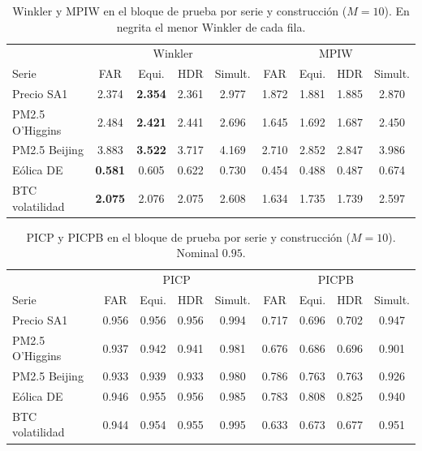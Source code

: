 \begin{table}[H]
\centering\small
\setlength{\tabcolsep}{3.5pt}
\caption{Winkler y MPIW en el bloque de prueba por serie y construcción ($M = 10$). En negrita el menor Winkler de cada fila.}
\label{tab:aneD_bloqueB_winkler}
\begin{tabular}{l cccc cccc}
\hline
 & \multicolumn{4}{c}{Winkler} & \multicolumn{4}{c}{MPIW} \\
Serie & FAR & Equi. & HDR & Simult. & FAR & Equi. & HDR & Simult. \\
\hline
Precio SA1 & 2.374 & \textbf{2.354} & 2.361 & 2.977 & 1.872 & 1.881 & 1.885 & 2.870 \\
PM2.5 O'Higgins & 2.484 & \textbf{2.421} & 2.441 & 2.696 & 1.645 & 1.692 & 1.687 & 2.450 \\
PM2.5 Beijing & 3.883 & \textbf{3.522} & 3.717 & 4.169 & 2.710 & 2.852 & 2.847 & 3.986 \\
Eólica DE & \textbf{0.581} & 0.605 & 0.622 & 0.730 & 0.454 & 0.488 & 0.487 & 0.674 \\
BTC volatilidad & \textbf{2.075} & 2.076 & 2.075 & 2.608 & 1.634 & 1.735 & 1.739 & 2.597 \\
\hline
\end{tabular}
\end{table}

\begin{table}[H]
\centering\small
\setlength{\tabcolsep}{3.5pt}
\caption{PICP y PICPB en el bloque de prueba por serie y construcción ($M = 10$). Nominal $0.95$.}
\label{tab:aneD_bloqueB_picp}
\begin{tabular}{l cccc cccc}
\hline
 & \multicolumn{4}{c}{PICP} & \multicolumn{4}{c}{PICPB} \\
Serie & FAR & Equi. & HDR & Simult. & FAR & Equi. & HDR & Simult. \\
\hline
Precio SA1 & 0.956 & 0.956 & 0.956 & 0.994 & 0.717 & 0.696 & 0.702 & 0.947 \\
PM2.5 O'Higgins & 0.937 & 0.942 & 0.941 & 0.981 & 0.676 & 0.686 & 0.696 & 0.901 \\
PM2.5 Beijing & 0.933 & 0.939 & 0.933 & 0.980 & 0.786 & 0.763 & 0.763 & 0.926 \\
Eólica DE & 0.946 & 0.955 & 0.956 & 0.985 & 0.783 & 0.808 & 0.825 & 0.940 \\
BTC volatilidad & 0.944 & 0.954 & 0.955 & 0.995 & 0.633 & 0.673 & 0.677 & 0.951 \\
\hline
\end{tabular}
\end{table}

